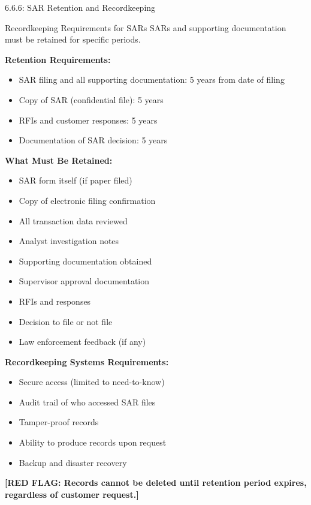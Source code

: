\documentclass[11pt,a4paper]{beamer}
\newcommand{\redflag}[1]{\textcolor{red!80!black}{\textbf{[RED FLAG: #1]}}}
\begin{document}
\begin{frame}{6.6.6: SAR Retention and Recordkeeping}
	\begin{block}{Recordkeeping Requirements for SARs}
		SARs and supporting documentation must be retained for specific periods.
	\end{block}
	\textbf{Retention Requirements:}
	\begin{itemize}
		\item SAR filing and all supporting documentation: 5 years from date of filing
		\item Copy of SAR (confidential file): 5 years

		\item RFIs and customer responses: 5 years
		\item Documentation of SAR decision: 5 years
	\end{itemize}
	\textbf{What Must Be Retained:}
	\begin{itemize}
		\item SAR form itself (if paper filed)
		\item Copy of electronic filing confirmation
		\item All transaction data reviewed
		\item Analyst investigation notes
		\item Supporting documentation obtained
		\item Supervisor approval documentation
		\item RFIs and responses
		\item Decision to file or not file
		\item Law enforcement feedback (if any)
	\end{itemize}
	\textbf{Recordkeeping Systems Requirements:}
	\begin{itemize}
		\item Secure access (limited to need-to-know)
		\item Audit trail of who accessed SAR files
		\item Tamper-proof records
		\item Ability to produce records upon request
		\item Backup and disaster recovery
	\end{itemize}
	\redflag{Records cannot be deleted until retention period expires, regardless of customer request.}
\end{frame}

\end{document}
